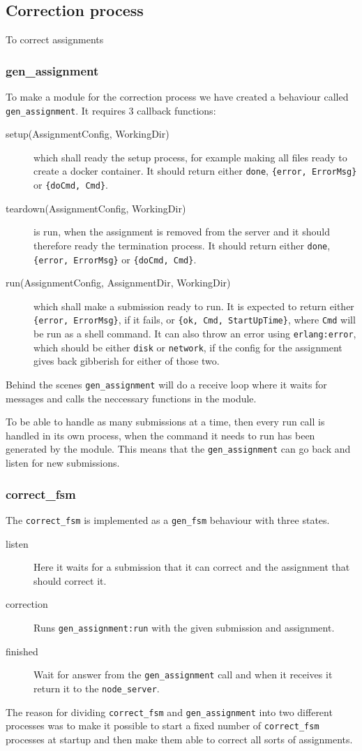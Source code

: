 \subsection{Correction process}
To correct assignments 

\subsubsection{gen\_assignment}
To make a module for the correction process we have created a behaviour called
\texttt{gen\_assignment}. It requires 3 callback functions:
\begin{description}
    \item[setup(AssignmentConfig, WorkingDir)] which shall ready the setup
    process, for example making all files ready to create a docker container.
    It should return either \texttt{done}, \texttt{\{error, ErrorMsg\}} or
    \texttt{\{doCmd, Cmd\}}.
    \item[teardown(AssignmentConfig, WorkingDir)] is run, when the assignment is
    removed from the server and it should therefore ready the termination
    process. It should return either \texttt{done}, \texttt{\{error, ErrorMsg\}}
    or \texttt{\{doCmd, Cmd\}}.
    \item[run(AssignmentConfig, AssignmentDir, WorkingDir)] which shall make a
    submission ready to run. It is expected to return either
    \texttt{\{error, ErrorMsg\}}, if it fails, or
    \texttt{\{ok, Cmd, StartUpTime\}}, where \texttt{Cmd} will be run as a shell
    command. It can also throw an error using \texttt{erlang:error}, which
    should be either \texttt{disk} or \texttt{network}, if the config for the
    assignment gives back gibberish for either of those two.
\end{description}

Behind the scenes \texttt{gen\_assignment} will do a receive loop where it waits
for messages and calls the neccessary functions in the module.

To be able to handle as many submissions at a time, then every run call is
handled in its own process, when the command it needs to run has been generated
by the module. This means that the \texttt{gen\_assignment} can go back and
listen for new submissions.

\subsubsection{correct\_fsm}
The \texttt{correct\_fsm} is implemented as a \texttt{gen\_fsm} behaviour with
three states.
\begin{description}
    \item[listen] Here it waits for a submission that it can correct and the
    assignment that should correct it.
    \item[correction] Runs \texttt{gen\_assignment:run} with the given
    submission and assignment.
    \item[finished] Wait for answer from the \texttt{gen\_assignment} call and
    when it receives it return it to the \texttt{node\_server}.
\end{description}

The reason for dividing \texttt{correct\_fsm} and \texttt{gen\_assignment} into
two different processes was to make it possible to start a fixed number of
\texttt{correct\_fsm} processes at startup and then make them able to correct
all sorts of assignments.
